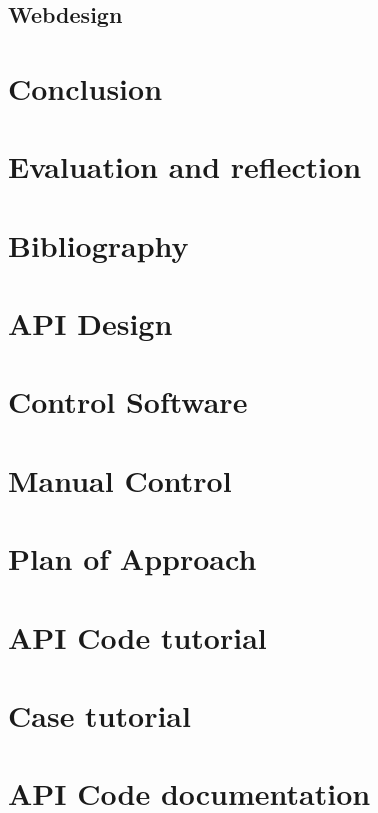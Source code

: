 \documentclass[a4paper,oneside]{book}
\begin{document}
\section{Webdesign}

\chapter{Conclusion}
\chapter{Evaluation and reflection}
\chapter{Bibliography}



\appendix
\chapter{API Design}
\chapter{Control Software}
\chapter{Manual Control}
\chapter{Plan of Approach}
\label{app:plan-of-approach}
\chapter{API Code tutorial}
\chapter{Case tutorial}
\chapter{API Code documentation}
\end{document}
